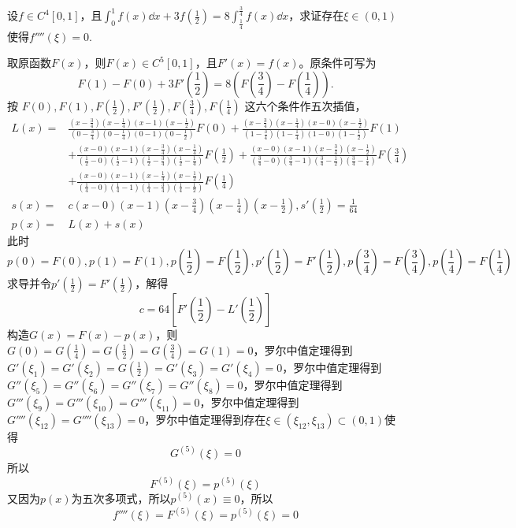 \newpage
\begin{example}[$f''''(\xi)=0$]
设$f\in C^4[0,1]$，且$\displaystyle \int_0^1f(x)\dd x+3f\left(\frac12\right)=8\int_{\frac14}^{\frac34}f(x)\dd x$，求证存在$\xi\in(0,1)$使得$f''''(\xi)=0$.
\end{example}
\begin{solution}
取原函数$F(x)$，则$F(x)\in C^5[0,1]$，且$F'(x)=f(x)$。原条件可写为
\[
F(1)-F(0)+3F'\left(\frac12\right)=8\left(F\left(\frac34\right)-F\left(\frac14\right)\right).
\]
按 $F(0),F(1),F\left(\frac12\right),F'\left(\frac12\right),F\left(\frac34\right),F\left(\frac14\right)$ 这六个条件作五次插值，
\begin{align*}
    L(x)=&\frac{(x-\frac34)(x-\frac14)(x-1)(x-\frac12)}{(0-\frac34)(0-\frac14)(0-1)(0-\frac12)}F(0)+\frac{(x-\frac34)(x-\frac14)(x-0)(x-\frac12)}{(1-\frac34)(1-\frac14)(1-0)(1-\frac12)}F(1)\\
    &+\frac{(x-0)(x-1)(x-\frac34)(x-\frac14)}{\left(\frac12-0\right)\left(\frac12-1\right)\left(\frac12-\frac34\right)\left(\frac12-\frac14\right)}F\left(\frac12\right)+\frac{(x-0)(x-1)(x-\frac34)(x-\frac12)}{\left(\frac34-0\right)\left(\frac34-1\right)\left(\frac34-\frac12\right)\left(\frac34-\frac14\right)}F\left(\frac34\right)\\
    &+\frac{(x-0)(x-1)(x-\frac14)(x-\frac12)}{\left(\frac14-0\right)\left(\frac14-1\right)\left(\frac14-\frac34\right)\left(\frac14-\frac12\right)}F\left(\frac14\right)\\
    s(x)=&c(x-0)(x-1)(x-\frac34)(x-\frac14)(x-\frac12),s'(\frac12)=\frac1{64}\\
p(x)=&L(x)+s(x)
\end{align*}
此时\[p(0)=F(0),p(1)=F(1),p\left(\frac12\right)=F\left(\frac12\right),p'\left(\frac12\right)=F'\left(\frac12\right),p\left(\frac34\right)=F\left(\frac34\right),p\left(\frac14\right)=F\left(\frac14\right)\]求导并令$p'\left(\frac12\right)=F'\left(\frac12\right)$，解得\[c=64\left[F'\left(\frac12\right)-L'\left(\frac12\right)\right]\]
构造$G(x)=F(x)-p(x)$，则$G(0)=G\left(\frac14\right)=G\left(\frac12\right)=G\left(\frac34\right)=G(1)=0$，罗尔中值定理得到$G'(\xi_1)=G'(\xi_2)=G\left(\frac12\right)=G'(\xi_3)=G'(\xi_4)=0$，罗尔中值定理得到$G''(\xi_5)=G''(\xi_6)=G''(\xi_7)=G''(\xi_8)=0$，罗尔中值定理得到$G'''(\xi_9)=G'''(\xi_{10})=G'''(\xi_{11})=0$，罗尔中值定理得到$G''''(\xi_{12})=G''''(\xi_{13})=0$，罗尔中值定理得到存在$\xi\in(\xi_{12},\xi_{13})\subset(0,1)$使得\[G^{(5)}(\xi)=0\]所以\[F^{(5)}(\xi)=p^{(5)}(\xi)\]又因为$p(x)$为五次多项式，所以$p^{(5)}(x)\equiv0$，所以\[f''''(\xi)=F^{(5)}(\xi)=p^{(5)}(\xi)=0\]
\end{solution}
\newpage

